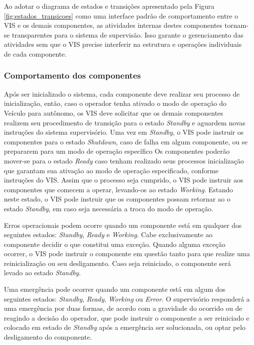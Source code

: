 \documentclass[conference]{IEEEtran}
\begin{document}
Ao adotar o diagrama de estados e transições apresentado pela Figura \ref{fig:estados_transicoes} como uma interface padrão de comportamento entre o VIS e os demais componentes, as atividades internas destes componentes tornam-se transparentes para o sistema de supervisão. Isso garante o gerenciamento das atividades sem que o VIS precise interferir na estrutura e operações individuais de cada componente.

\subsubsection{Comportamento dos componentes}\label{subsec:comportamento_componentes}

Após ser inicializado o sistema, cada componente deve realizar seu processo de inicialização, então, caso o operador tenha ativado o modo de operação do Veículo para autônomo, os VIS deve solicitar que os demais componentes realizem seu procedimento de transição para o estado \textit{Standby} e aguardem novas instruções do sistema supervisório. Uma vez em \textit{Standby}, o VIS pode instruir os componentes para o estado \textit{Shutdown}, caso de falha em algum componente, ou se prepararem para um modo de operação específico Os componentes poderão mover-se para o estado \textit{Ready} caso tenham realizado seus processos inicialização que garantam sua ativação ao modo de operação especificado, conforme instruções do VIS. Assim que o processo seja cumprido, o VIS pode instruir aos componentes que comecem a operar, levando-os ao estado \textit{Working}. Estando neste estado, o VIS pode instruir que os componentes possam retornar ao o estado \textit{Standby}, em caso seja necessária a troca do modo de operação.

Erros operacionais podem ocorre quando um componente está em qualquer dos seguintes estados: \textit{Standby}, \textit{Ready} e \textit{Working}. Cabe exclusivamente ao componente decidir o que constitui uma exceção. Quando alguma exceção ocorrer, o VIS pode instruir o componente em questão tanto para que realize uma reinicialização ou seu desligamento. Caso seja reiniciado, o componente será levado ao estado \textit{Standby}.

Uma emergência pode ocorrer quando um componente está em algum dos seguintes estados: \textit{Standby}, \textit{Ready}, \textit{Working } ou \textit{Error}. O supervisório responderá a uma emergência por duas formas, de acordo com a gravidade do ocorrido ou de reagindo a decisão do operador, que pode instruir o componente a ser reiniciado e colocado em estado de \textit{Standby} após a emergência ser solucionada, ou optar pelo desligamento do componente.
\end{document}
